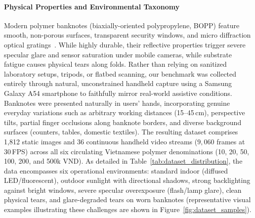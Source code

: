 \documentclass[final,5p,times,twocolumn,authoryear]{elsarticle}
\begin{document}
\paragraph{Physical Properties and Environmental Taxonomy}
Modern polymer banknotes (biaxially-oriented polypropylene, BOPP) feature smooth, non-porous surfaces, transparent security windows, and micro diffraction optical gratings~\cite{vanRenesse2005}. While highly durable, their reflective properties trigger severe specular glare and sensor saturation under mobile cameras, while substrate fatigue causes physical tears along folds. Rather than relying on sanitized laboratory setups, tripods, or flatbed scanning, our benchmark was collected entirely through natural, unconstrained handheld capture using a Samsung Galaxy A54 smartphone to faithfully mirror real-world assistive conditions. Banknotes were presented naturally in users' hands, incorporating genuine everyday variations such as arbitrary working distances (15--45\,cm), perspective tilts, partial finger occlusions along banknote borders, and diverse background surfaces (counters, tables, domestic textiles). The resulting dataset comprises 1,812 static images and 36 continuous handheld video streams ($9{,}060$ frames at $30$\,FPS) across all six circulating Vietnamese polymer denominations (10, 20, 50, 100, 200, and 500k VND). As detailed in Table~\ref{tab:dataset_distribution}, the data encompasses six operational environments: standard indoor (diffused LED/fluorescent), outdoor sunlight with directional shadows, strong backlighting against bright windows, severe specular overexposure (flash/lamp glare), clean physical tears, and glare-degraded tears on worn banknotes (representative visual examples illustrating these challenges are shown in Figure~\ref{fig:dataset_samples}).
\end{document}
